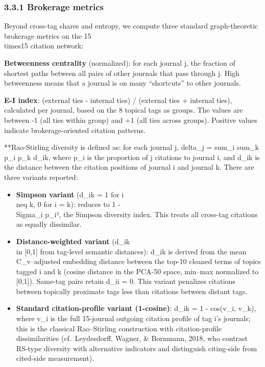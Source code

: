 \documentclass[pdflatex,sn-apa]{sn-jnl}
\providecommand{\tightlist}{\setlength{\itemsep}{0pt}\setlength{\parskip}{0pt}}
\begin{document}
\subsubsection{3.3.1 Brokerage metrics}\label{brokerage-metrics}

Beyond cross-tag shares and entropy, we compute three standard
graph-theoretic brokerage metrics on the 15\\times15 citation network:

\textbf{Betweenness centrality} (normalized): for each journal j, the
fraction of shortest paths between all pairs of other journals that pass
through j. High betweenness means that a journal is on many
``shortcuts'' to other journals.

\textbf{E-I index}: (external ties - internal ties) / (external ties +
internal ties), calculated per journal, based on the 8 topical tags as
groups. The values are between -1 (all ties within group) and +1 (all
ties across groups). Positive values indicate brokerage-oriented
citation patterns.

**Rao-Stirling diversity is defined as: for each journal j, delta\_j =
sum\_i sum\_k p\_i p\_k d\_ik, where p\_i is the proportion of j
citations to journal i, and d\_ik is the distance between the citation
positions of journal i and journal k. There are three variants reported:

\begin{itemize}
\tightlist
\item
  \textbf{Simpson variant} (d\_ik = 1 for i \\neq k, 0 for i = k): reduces
  to 1 - \\Sigma\_i p\_i², the Simpson diversity index. This treats all
  cross-tag citations as equally dissimilar.
\item
  \textbf{Distance-weighted variant} (d\_ik \\in {[}0,1{]} from tag-level
  semantic distances): d\_ik is derived from the mean C\_v--adjusted
  embedding distance between the top-10 cleaned terms of topics tagged i
  and k (cosine distance in the PCA-50 space, min--max normalized to
  {[}0,1{]}). Same-tag pairs retain d\_ii = 0. This variant penalizes
  citations between topically proximate tags less than citations between
  distant tags.
\item
  \textbf{Standard citation-profile variant (1-cosine)}: d\_ik = 1 -
  cos(v\_i, v\_k), where v\_i is the full 15-journal outgoing citation
  profile of tag i's journals; this is the classical Rao--Stirling
  construction with citation-profile dissimilarities (cf.~Leydesdorff,
  Wagner, \& Bornmann, 2018, who contrast RS-type diversity with
  alternative indicators and distinguish citing-side from cited-side
  measurement).
\end{itemize}
\end{document}
